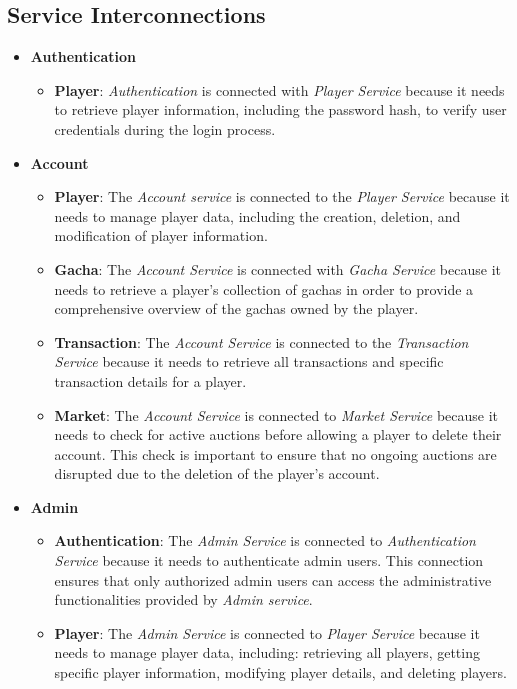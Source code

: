 \documentclass{article}
\begin{document}
\subsection{Service Interconnections}
\begin{itemize}
    \item \textbf{Authentication}
          \begin{itemize}
              \item \textbf{Player}: \emph{Authentication} is connected with \emph{Player Service} because it needs to retrieve player information, including the password hash, to verify user credentials during the login process.
          \end{itemize}
    \item \textbf{Account}
          \begin{itemize}
              \item \textbf{Player}: The \emph{Account service} is connected to the \emph{Player Service} because it needs to manage player data, including the creation, deletion, and modification of player information.
              \item \textbf{Gacha}: The \emph{Account Service} is connected with \emph{Gacha Service} because it needs to retrieve a player's collection of gachas in order to provide a comprehensive overview of the gachas owned by the player.
              \item \textbf{Transaction}: The \emph{Account Service} is connected to the \emph{Transaction Service} because it needs to retrieve all transactions and specific transaction details for a player.
              \item \textbf{Market}: The \emph{Account Service} is connected to \emph{Market Service} because it needs to check for active auctions before allowing a player to delete their account. This check is important to ensure that no ongoing auctions are disrupted due to the deletion of the player's account.
          \end{itemize}
    \item \textbf{Admin}
          \begin{itemize}
              \item \textbf{Authentication}: The \emph{Admin Service} is connected to \emph{Authentication Service} because it needs to authenticate admin users. This connection ensures that only authorized admin users can access the administrative functionalities provided by \emph{Admin service}.
              \item \textbf{Player}: The \emph{Admin Service} is connected to \emph{Player Service} because it needs to manage player data, including: retrieving all players, getting specific player information, modifying player details, and deleting players.

\end{itemize}
\end{itemize}
\end{document}
